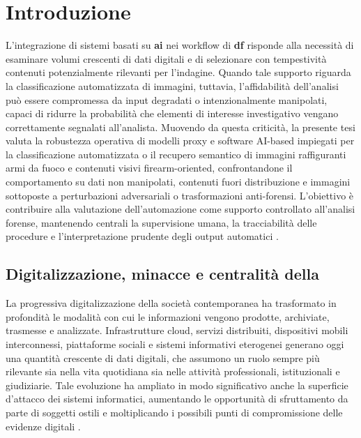 \chapter{Introduzione}\label{chap:introduction}
L'integrazione di sistemi basati su \textbf{\gls{ai}} nei workflow di \textbf{\gls{df}} risponde alla necessità di esaminare volumi crescenti di dati digitali e di selezionare con tempestività contenuti potenzialmente rilevanti per l'indagine. Quando tale supporto riguarda la classificazione automatizzata di immagini, tuttavia, l'affidabilità dell'analisi può essere compromessa da input degradati o intenzionalmente manipolati, capaci di ridurre la probabilità che elementi di interesse investigativo vengano correttamente segnalati all'analista. Muovendo da questa criticità, la presente tesi valuta la robustezza operativa di modelli proxy e software AI-based impiegati per la classificazione automatizzata o il recupero semantico di immagini raffiguranti armi da fuoco e contenuti visivi firearm-oriented, confrontandone il comportamento su dati non manipolati, contenuti fuori distribuzione e immagini sottoposte a perturbazioni adversariali o trasformazioni anti-forensi. L'obiettivo è contribuire alla valutazione dell'automazione come supporto controllato all'analisi forense, mantenendo centrali la supervisione umana, la tracciabilità delle procedure e l'interpretazione prudente degli output automatici \cite{costantini2019digital,sanna2024preliminary,sanna2025pixelperfect}.


\section[Digitalizzazione, minacce e centralità della Digital Forensics]{Digitalizzazione, minacce e centralità della }
La progressiva digitalizzazione della società contemporanea ha trasformato in profondità le modalità con cui le informazioni vengono prodotte, archiviate, trasmesse e analizzate. Infrastrutture cloud, servizi distribuiti, dispositivi mobili interconnessi, piattaforme sociali e sistemi informativi eterogenei generano oggi una quantità crescente di dati digitali, che assumono un ruolo sempre più rilevante sia nella vita quotidiana sia nelle attività professionali, istituzionali e giudiziarie. Tale evoluzione ha ampliato in modo significativo anche la superficie d'attacco dei sistemi informatici, aumentando le opportunità di sfruttamento da parte di soggetti ostili e moltiplicando i possibili punti di compromissione delle evidenze digitali \cite{garfinkel2010digital,casey2011digital}.

